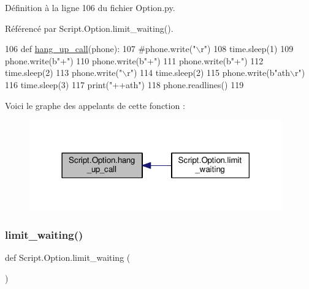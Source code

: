 Définition à la ligne 106 du fichier Option.\+py.



Référencé par Script.\+Option.\+limit\+\_\+waiting().


\begin{DoxyCode}
106 \textcolor{keyword}{def }\hyperlink{namespaceScript_1_1Option_a22c03fd81ddb28ef13f194565b4996ba}{hang\_up\_call}(phone):
107     \textcolor{comment}{#phone.write("\(\backslash\)r")
}
108     time.sleep(1)
109     phone.write(b\textcolor{stringliteral}{"+"})
110     phone.write(b\textcolor{stringliteral}{"+"})
111     phone.write(b\textcolor{stringliteral}{"+"})
112     time.sleep(2)
113     phone.write(\textcolor{stringliteral}{"\(\backslash\)r"})
114     time.sleep(2)
115     phone.write(b\textcolor{stringliteral}{"ath\(\backslash\)r"})
116     time.sleep(3)
117     print(\textcolor{stringliteral}{"++ath"})
118     phone.readlines()
119 \end{DoxyCode}
Voici le graphe des appelants de cette fonction \+:\nopagebreak
\begin{figure}[H]
\begin{center}
\leavevmode
\includegraphics[width=309pt]{namespaceScript_1_1Option_a22c03fd81ddb28ef13f194565b4996ba_icgraph}
\end{center}
\end{figure}
\mbox{\label{namespaceScript_1_1Option_a1707d1e8b288159100845df330fc8d51}} 
\subsubsection{\texorpdfstring{limit\+\_\+waiting()}{limit\_waiting()}}
{\footnotesize\ttfamily def Script.\+Option.\+limit\+\_\+waiting (\begin{DoxyParamCaption}{ }\end{DoxyParamCaption})}



